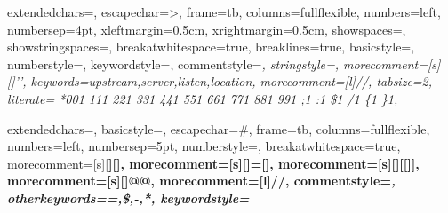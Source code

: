 %
{%
		extendedchars=\true,
		escapechar=>, %
		frame=tb, %
    columns=fullflexible,
		numbers=left, %
    numbersep=4pt, %
		xleftmargin=0.5cm,
		xrightmargin=0.5cm,
		showspaces=\false,
		showstringspaces=\false,
		breakatwhitespace=true,         %
		breaklines=true,                 %
		basicstyle=\color{black}\small\sffamily,
    numberstyle=\footnotesize\color{gray}, %
    keywordstyle={\color{black}\bfseries},
		commentstyle=\color{gray}\itshape, %
		stringstyle=\color{orange}, %
    morecomment=[s][\color{blue}]{'}{'},
		keywords={upstream,server,listen,location},%
    morecomment=[l]{//},
		tabsize=2,
    literate=
     *{0}{{{\color{numb}0}}}{1}
      {1}{{{\color{numb}1}}}{1}
      {2}{{{\color{numb}2}}}{1}
      {3}{{{\color{numb}3}}}{1}
      {4}{{{\color{numb}4}}}{1}
      {5}{{{\color{numb}5}}}{1}
      {6}{{{\color{numb}6}}}{1}
      {7}{{{\color{numb}7}}}{1}
      {8}{{{\color{numb}8}}}{1}
      {9}{{{\color{numb}9}}}{1}
      {;}{{{\color{punct}{;}}}}{1}
      {:}{{{\color{punct}{:}}}}{1}
      {\$}{{{\color{punct}{\$}}}}{1}
      {/}{{{\color{punct}{/}}}}{1}
      {\{}{{{\color{delim}{\{}}}}{1}
      {\}}{{{\color{delim}{\}}}}}{1},
}

%
{%
		extendedchars=\true,
    basicstyle=\sffamily\small,
		escapechar=\#, %
		frame=tb, %
    columns=fullflexible,
		numbers=left, %
    numbersep=5pt,%
    numberstyle=\small\color{gray}, %
		breakatwhitespace=true,         %
    morecomment=[s][\color{black}\bfseries]{[}{]},
    morecomment=[s][\color{purple}\bfseries]{=[}{]},
    morecomment=[s][\color{pink}\bfseries]{[[}{]]},
    morecomment=[s][\color{blue}\bfseries]{@}{@},
    morecomment=[l]{//},
    commentstyle=\color{gray}\itshape,
    otherkeywords={=,\$,-,*},
    keywordstyle={\color{brown}\bfseries}
}

